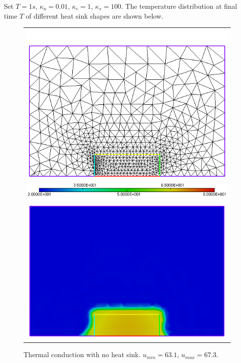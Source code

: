 Set $T=1s$, $\kappa_a=0.01$, $\kappa_c=1$, $\kappa_s=100$. The temperature distribution at final time $T$ of different heat sink shapes are shown below.\\
\begin{figure}[h!]
	\centering
	\begin{tabular}{c}
		\includegraphics[width=.8\linewidth]{figures/nosinkc} \\ \includegraphics[width=.8\linewidth]{figures/nosinkb}
	\end{tabular}
	\caption{Thermal conduction with no heat sink. $u_{min}=63.1$, $u_{max}=67.3$.}
\end{figure}
